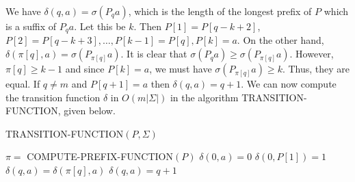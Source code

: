 \documentclass{article}
\begin{document}
We have $\delta(q,a) = \sigma(P_qa)$, which is the length of the longest prefix of $P$ which is a suffix of $P_q a$.  Let this be $k$.  Then $P[1] = P[q-k+2]$, $P[2] = P[q-k+3], \ldots, P[k-1] = P[q], P[k] = a$.  On the other hand, $\delta(\pi[q],a) = \sigma(P_{\pi[q]}a)$.  It is clear that $\sigma(P_q a) \geq \sigma(P_{\pi[q]}a)$.  However, $\pi[q] \geq k-1$ and since $P[k] = a$, we must have $\sigma(P_{\pi[q]}a) \geq k$.  Thus, they are equal.   If $q \neq m$ and $P[q+1] = a$ then $\delta(q,a) = q+1$.  We can now compute the transition function $\delta$ in $O(m|\Sigma|)$ in the algorithm TRANSITION-FUNCTION, given below. \\

\begin{algorithm}
\caption{TRANSITION-FUNCTION$(P,\Sigma)$}
\begin{algorithmic}
\State $\pi = $ COMPUTE-PREFIX-FUNCTION$(P)$
	\State $\delta(0,a) = 0$
\EndFor
\State $\delta(0,P[1]) = 1$
			\State $\delta(q,a) = \delta(\pi[q],a)$
		\Else
			\State $\delta(q,a) = q+1$
		\EndIf
	\EndFor
\EndFor
\end{algorithmic}
\end{algorithm}
\end{document}
